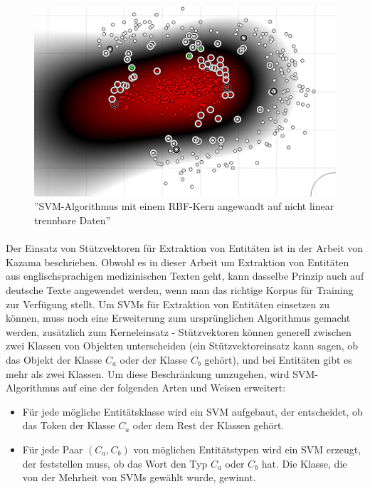 \begin{figure}
\centering
\includegraphics[width=\textwidth,angle=90]{Bilder/svm-nonlinear-rbf.png}
\caption{''SVM-Algorithmus mit einem RBF-Kern angewandt auf nicht linear trennbare Daten''}
\label{fig:SVM-NONLINEAR-ISSUE}
\end{figure}

\paragraph{}
Der Einsatz von Stützvektoren für Extraktion von Entitäten ist in der Arbeit von Kazama\cite{kazama2002tuning} beschrieben. Obwohl es in dieser Arbeit um Extraktion von Entitäten aus englischsprachigen medizinischen Texten geht, kann dasselbe Prinzip auch auf deutsche Texte angewendet werden, wenn man das richtige Korpus für Training zur Verfügung stellt. Um SVMs für Extraktion von Entitäten einsetzen zu können, muss noch eine Erweiterung zum ursprünglichen Algorithmus gemacht werden, zusätzlich zum Kerneleinsatz - Stützvektoren können generell zwischen zwei Klassen von Objekten unterscheiden (ein Stützvektoreinsatz kann sagen, ob das Objekt der Klasse $C_a$ oder der Klasse $C_b$ gehört), und bei Entitäten gibt es mehr als zwei Klassen. Um diese Beschränkung umzugehen, wird SVM-Algorithmus auf eine der folgenden Arten und Weisen erweitert:

\begin{itemize}
\item Für jede mögliche Entitätsklasse wird ein SVM aufgebaut, der entscheidet, ob das Token der Klasse $C_a$ oder dem Rest der Klassen gehört.
\item Für jede Paar $(C_a, C_b)$ von möglichen Entitätstypen wird ein SVM erzeugt, der feststellen muss, ob das Wort den Typ $C_a$ oder $C_b$ hat. Die Klasse, die von der Mehrheit von SVMs gewählt wurde, gewinnt.
\end{itemize}

